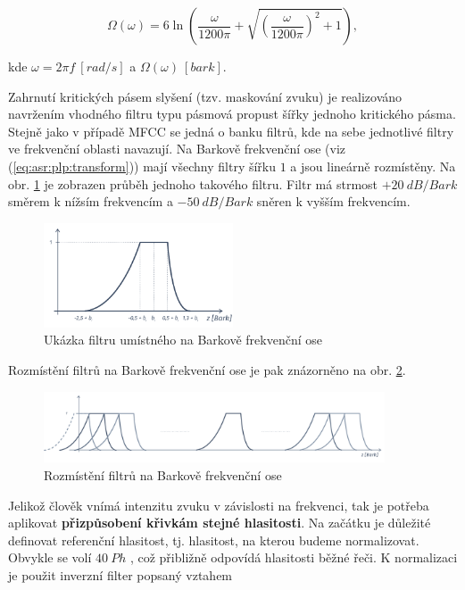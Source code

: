 \begin{equation}
  \Omega\left(\omega\right) = 6 \ln \left( \frac{\omega}{1200\pi} + \sqrt{\left(\frac{\omega}{1200\pi}\right)^2 + 1} \right),
  \label{eq:asr:plp:transform}
\end{equation}

\noindent kde $\omega = 2\pi f\ \left[rad/s\right]$ a $\Omega\left(\omega\right)\ \left[bark\right]$.

Zahrnutí kritických pásem slyšení (tzv. maskování zvuku) je realizováno navržením vhodného filtru typu pásmová propust šířky jednoho kritického pásma. Stejně jako v případě MFCC se jedná o banku filtrů, kde na sebe jednotlivé filtry ve frekvenční oblasti navazují. Na Barkově frekvenční ose (viz (\ref{eq:asr:plp:transform})) mají všechny filtry šířku $1$ a jsou lineárně rozmístěny. Na obr. \ref{fig:asr:plp:filter} je zobrazen průběh jednoho takového filtru. Filtr má strmost $+20\ dB/Bark$ směrem k nížsím frekvencím a $-50\ dB/Bark$ sněren k vyšším frekvencím.

\begin{figure}[hbpt]
  \centering
  \includegraphics[width=0.5\textwidth]{./ch4-asr/img/plp_filter.pdf}
  \caption{Ukázka filtru umístného na Barkově frekvenční ose}
  \label{fig:asr:plp:filter}
\end{figure}

Rozmístění filtrů na Barkově frekvenční ose je pak znázorněno na obr. \ref{fig:asr:plp:bank}.

\begin{figure}[hbpt]
  \centering
  \includegraphics[width=0.9\textwidth]{./ch4-asr/img/plp-bank.pdf}
  \caption{Rozmístění filtrů na Barkově frekvenční ose}
  \label{fig:asr:plp:bank}
\end{figure}

Jelikož člověk vnímá intenzitu zvuku v závislosti na frekvenci, tak je potřeba aplikovat \textbf{přizpůsobení křivkám stejné hlasitosti}. Na začátku je důležité definovat referenční hlasitost, tj. hlasitost, na kterou budeme normalizovat. Obvykle se volí $40\ Ph$ \cite{Psutka2006}, což přibližně odpovídá hlasitosti běžné řeči. K normalizaci je použit inverzní filter popsaný vztahem

